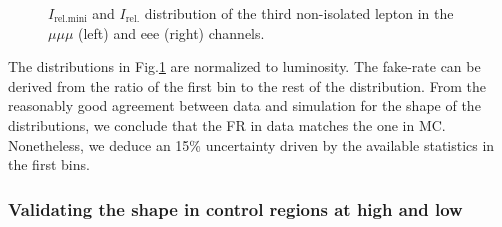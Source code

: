 \begin{figure}[!hbtp]
\caption{ $I_{\text{rel.mini}}$ and $I_{\text{rel.}}$ distribution of the third non-isolated lepton in the $\mu\mu\mu$ (left) and eee (right) channels. }
\label{fig:ttBar_FR_controlPlots}
\end{figure}

The distributions in Fig.\ref{fig:ttBar_FR_controlPlots} are normalized to luminosity. 
The fake-rate can be derived from the ratio of the first bin to the rest of the distribution. 
From the reasonably good agreement between data and simulation for the shape of the distributions, we conclude that the FR in data matches the one in MC. 
Nonetheless, we deduce an 15\% uncertainty driven by the available statistics in the first bins.

\subsubsection{ Validating the \texorpdfstring{\ttbar}{ttbar} shape in control regions at high and low \ETmiss}

